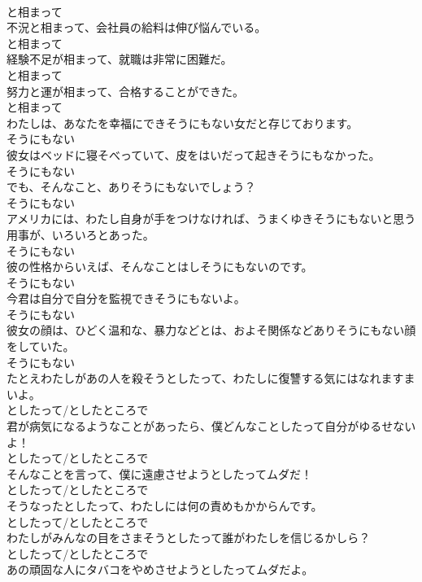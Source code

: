 \documentclass[8pt]{extreport}
\begin{document}
\begin{CJK}{UTF8}{min}
\\	と相まって
\\	不況と相まって、会社員の給料は伸び悩んでいる。	
\\	と相まって
\\	経験不足が相まって、就職は非常に困難だ。	
\\	と相まって
\\	努力と運が相まって、合格することができた。	
\\	と相まって
\\	わたしは、あなたを幸福にできそうにもない女だと存じております。	
\\	そうにもない
\\	彼女はベッドに寝そべっていて、皮をはいだって起きそうにもなかった。	
\\	そうにもない
\\	でも、そんなこと、ありそうにもないでしょう？	
\\	そうにもない
\\	アメリカには、わたし自身が手をつけなければ、うまくゆきそうにもないと思う用事が、いろいろとあった。	
\\	そうにもない
\\	彼の性格からいえば、そんなことはしそうにもないのです。	
\\	そうにもない
\\	今君は自分で自分を監視できそうにもないよ。	
\\	そうにもない
\\	彼女の顔は、ひどく温和な、暴力などとは、およそ関係などありそうにもない顔をしていた。	
\\	そうにもない
\\	たとえわたしがあの人を殺そうとしたって、わたしに復讐する気にはなれますまいよ。	
\\	としたって/としたところで
\\	君が病気になるようなことがあったら、僕どんなことしたって自分がゆるせないよ！	
\\	としたって/としたところで
\\	そんなことを言って、僕に遠慮させようとしたってムダだ！	
\\	としたって/としたところで
\\	そうなったとしたって、わたしには何の責めもかからんです。	
\\	としたって/としたところで
\\	わたしがみんなの目をさまそうとしたって誰がわたしを信じるかしら？	
\\	としたって/としたところで
\\	あの頑固な人にタバコをやめさせようとしたってムダだよ。	

\end{CJK}
\end{document}
